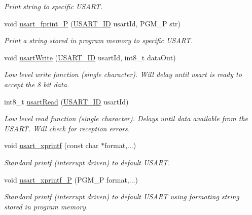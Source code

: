 \begin{DoxyCompactItemize}
\begin{DoxyCompactList}\small\item\em Print string to specific U\+S\+A\+RT. \end{DoxyCompactList}\item 
void \hyperlink{group__usart_async_module_gaa376b136593fb6bc0e5e9f7b35473f14}{usart\+\_\+fprint\+\_\+P} (\hyperlink{group__usart_async_module_gaae3c5ea77a411e5f40e4377f77067b86}{U\+S\+A\+R\+T\+\_\+\+ID} usart\+Id, P\+G\+M\+\_\+P str)
\begin{DoxyCompactList}\small\item\em Print a string stored in program memory to specific U\+S\+A\+RT. \end{DoxyCompactList}\item 
void \hyperlink{group__usart_async_module_ga12dffa6d7df2b7e6049e3bc08b939e07}{usart\+Write} (\hyperlink{group__usart_async_module_gaae3c5ea77a411e5f40e4377f77067b86}{U\+S\+A\+R\+T\+\_\+\+ID} usart\+Id, int8\+\_\+t data\+Out)
\begin{DoxyCompactList}\small\item\em Low level write function (single character). Will delay until usart is ready to accept the 8 bit data. \end{DoxyCompactList}\item 
int8\+\_\+t \hyperlink{group__usart_async_module_ga152b8198df4c2d75e34547a8c13c7457}{usart\+Read} (\hyperlink{group__usart_async_module_gaae3c5ea77a411e5f40e4377f77067b86}{U\+S\+A\+R\+T\+\_\+\+ID} usart\+Id)
\begin{DoxyCompactList}\small\item\em Low level read function (single character). Delays until data available from the U\+S\+A\+RT. Will check for reception errors. \end{DoxyCompactList}\item 
void \hyperlink{group__usart_async_module_ga9ec472642da5fe42928fb1d81e3115cd}{usart\+\_\+xprintf} (const char $\ast$format,...)
\begin{DoxyCompactList}\small\item\em Standard printf (interrupt driven) to default U\+S\+A\+RT. \end{DoxyCompactList}\item 
void \hyperlink{group__usart_async_module_gaf7d0d5b028d30f55439119f42ad7ed69}{usart\+\_\+xprintf\+\_\+P} (P\+G\+M\+\_\+P format,...)
\begin{DoxyCompactList}\small\item\em Standard printf (interrupt driven) to default U\+S\+A\+RT using formating string stored in program memory. \end{DoxyCompactList}\item 

\end{DoxyCompactItemize}

